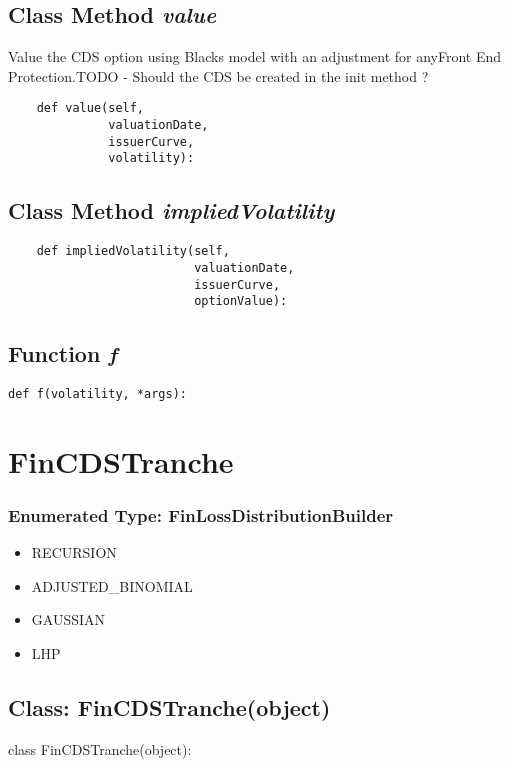 \documentclass[twoside,11pt]{book}
\begin{document}
\subsection{Class Method {\it value}}
Value the CDS option using Blacks model with an adjustment for anyFront End Protection.TODO - Should the CDS be created in the init method ? 

\begin{lstlisting}
    def value(self,
              valuationDate,
              issuerCurve,
              volatility):
\end{lstlisting}

\subsection{Class Method {\it impliedVolatility}}


\begin{lstlisting}
    def impliedVolatility(self,
                          valuationDate,
                          issuerCurve,
                          optionValue):
\end{lstlisting}

\subsection{Function {\it f}}


\begin{lstlisting}
def f(volatility, *args):
\end{lstlisting}

\newpage
\section{FinCDSTranche}

\subsubsection{Enumerated Type: FinLossDistributionBuilder}
\begin{itemize}
\item{RECURSION}
\item{ADJUSTED\_BINOMIAL}
\item{GAUSSIAN}
\item{LHP}
\end{itemize}

\subsection{Class: FinCDSTranche(object)}
class FinCDSTranche(object):
\end{document}
